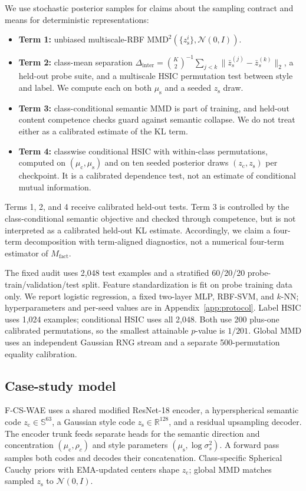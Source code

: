 \documentclass{article}
\newcommand{\ours}{F-CS-WAE}
\newcommand{\zc}{z_{\mathrm{c}}}
\newcommand{\zs}{z_{\mathrm{s}}}
\newcommand{\muc}{\mu_{\mathrm{c}}}
\newcommand{\mus}{\mu_{\mathrm{s}}}
\newcommand{\R}{\mathbb{R}}
\newcommand{\MMD}{\mathrm{MMD}}
\newcommand{\Dinter}{\Delta_{\mathrm{inter}}}
\begin{document}
We use stochastic posterior samples for claims about the sampling contract
and means for deterministic representations:
\begin{itemize}
    \item \textbf{Term 1:} unbiased multiscale-RBF
    $\MMD^2(\{\zs^i\},\mathcal N(0,I))$.
    \item \textbf{Term 2:} class-mean separation
    $\Dinter=\binom K2^{-1}\sum_{j<k}\|\bar z_s^{(j)}-\bar z_s^{(k)}\|_2$,
    a held-out probe suite, and a multiscale HSIC permutation test between
    style and label.  We compute each on both $\mus$ and a seeded $\zs$ draw.
    \item \textbf{Term 3:} class-conditional semantic MMD is part of training,
    and held-out content competence checks guard against semantic collapse.
    We do not treat either as a calibrated estimate of the KL term.
    \item \textbf{Term 4:} classwise conditional HSIC with within-class
    permutations, computed on $(\muc,\mus)$ and on ten seeded posterior draws
    $(\zc,\zs)$ per checkpoint.  It is a calibrated dependence test, not an
    estimate of conditional mutual information.
\end{itemize}
Terms 1, 2, and 4 receive calibrated held-out tests.  Term 3 is controlled by
the class-conditional semantic objective and checked through competence, but
is not interpreted as a calibrated held-out KL estimate.  Accordingly, we
claim a four-term decomposition with term-aligned diagnostics, not a numerical
four-term estimator of $M_{\mathrm{fact}}$.

The fixed audit uses 2,048 test examples and a stratified 60/20/20
probe-train/validation/test split.  Feature standardization is fit on probe
training data only.  We report logistic regression, a fixed two-layer MLP,
RBF-SVM, and $k$-NN; hyperparameters and per-seed values are in
Appendix~\ref{app:protocol}.  Label HSIC uses 1,024 examples; conditional
HSIC uses all 2,048.  Both use 200 plus-one calibrated permutations, so the
smallest attainable $p$-value is $1/201$.  Global MMD uses an independent
Gaussian RNG stream and a separate 500-permutation equality calibration.

\subsection{Case-study model}

\ours{} uses a shared modified ResNet-18 encoder, a hyperspherical semantic
code $\zc\in\mathbb S^{63}$, a Gaussian style code $\zs\in\R^{128}$, and a
residual upsampling decoder.  The encoder trunk feeds separate heads for the
semantic direction and concentration $(\muc,\rho_c)$ and style parameters
$(\mus,\log\sigma_s^2)$.  A forward pass samples both codes and decodes their
concatenation.  Class-specific Spherical Cauchy priors with EMA-updated centers
shape $\zc$; global MMD matches sampled $\zs$ to $\mathcal N(0,I)$.
\end{document}

